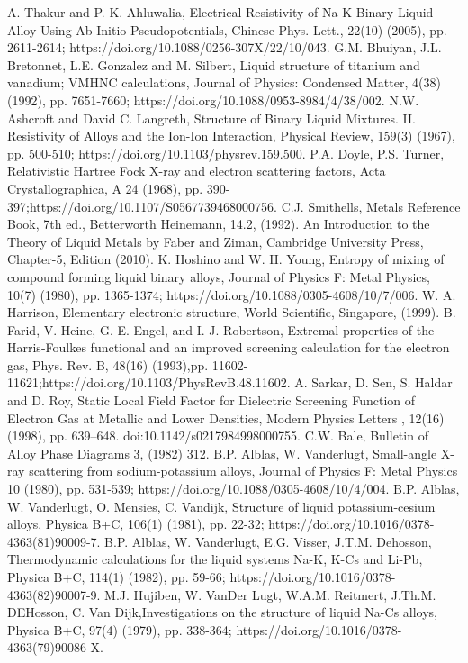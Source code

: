 \documentclass[final12pt]{elsarticle}
\begin{document}
\begin{thebibliography}{thesis}
A. Thakur and P. K. Ahluwalia, Electrical Resistivity of Na-K Binary Liquid Alloy Using Ab-Initio Pseudopotentials, Chinese Phys. Lett., 22(10) (2005), pp. 2611-2614; https://doi.org/10.1088/0256-307X/22/10/043.
G.M. Bhuiyan, J.L. Bretonnet, L.E. Gonzalez and M. Silbert, Liquid structure of titanium and vanadium; VMHNC calculations, Journal of Physics: Condensed Matter, 4(38) (1992), pp. 7651-7660; https://doi.org/10.1088/0953-8984/4/38/002.
N.W. Ashcroft and David C. Langreth, Structure of Binary Liquid Mixtures. II. Resistivity of Alloys and the Ion-Ion Interaction, Physical Review, 159(3) (1967), pp. 500-510; https://doi.org/10.1103/physrev.159.500.
P.A. Doyle, P.S. Turner, Relativistic Hartree Fock X-ray and electron scattering factors, Acta Crystallographica, A 24 (1968), pp. 390-397;https://doi.org/10.1107/S0567739468000756.
C.J. Smithells, Metals Reference Book, 7th ed., Betterworth Heinemann, 14.2, (1992).
An Introduction to the Theory of Liquid Metals by Faber and Ziman, Cambridge University Press, Chapter-5, Edition (2010).
K. Hoshino and W. H. Young, Entropy of mixing of compound forming liquid binary alloys, Journal of Physics F: Metal Physics, 10(7) (1980), pp. 1365-1374; https://doi.org/10.1088/0305-4608/10/7/006.
W. A. Harrison, Elementary electronic structure, World Scientific, Singapore, (1999).
B. Farid, V. Heine, G. E. Engel, and I. J. Robertson, Extremal properties of the Harris-Foulkes functional and an improved screening calculation for the electron gas, Phys. Rev. B, 48(16) (1993),pp. 11602-11621;https://doi.org/10.1103/PhysRevB.48.11602. 
A. Sarkar, D. Sen, S. Haldar and D. Roy, Static Local Field Factor for Dielectric Screening Function of Electron Gas at Metallic and Lower Densities, Modern Physics Letters , 12(16) (1998), pp. 639–648. doi:10.1142/s0217984998000755.
C.W. Bale, Bulletin of Alloy Phase Diagrams 3, (1982) 312.
B.P. Alblas, W. Vanderlugt, Small-angle X-ray scattering from sodium-potassium alloys, Journal of Physics F: Metal Physics 10 (1980), pp. 531-539; https://doi.org/10.1088/0305-4608/10/4/004.
B.P. Alblas, W. Vanderlugt, O. Mensies, C. Vandijk, Structure of liquid potassium-cesium alloys, Physica B+C, 106(1) (1981), pp. 22-32; https://doi.org/10.1016/0378-4363(81)90009-7.
B.P. Alblas, W. Vanderlugt, E.G. Visser, J.T.M. Dehosson, Thermodynamic calculations for the liquid systems Na-K, K-Cs and Li-Pb, Physica B+C, 114(1) (1982), pp. 59-66; https://doi.org/10.1016/0378-4363(82)90007-9.
M.J. Hujiben, W. VanDer Lugt, W.A.M. Reitmert, J.Th.M. DEHosson, C. Van Dijk,Investigations on the structure of liquid Na-Cs alloys, Physica B+C, 97(4) (1979), pp. 338-364; https://doi.org/10.1016/0378-4363(79)90086-X.

\end{thebibliography}
\end{document}

